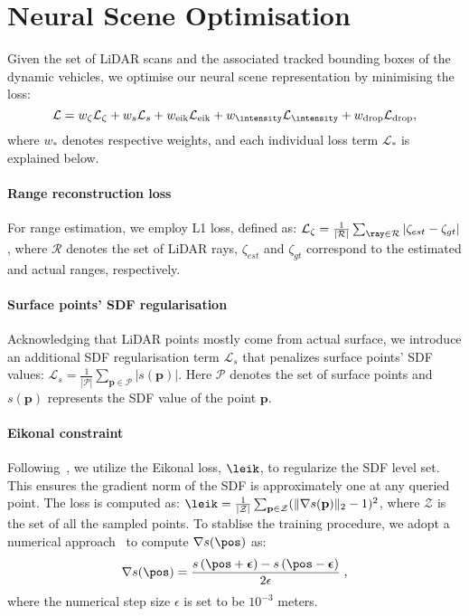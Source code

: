 \section{Neural Scene Optimisation} \label{sec:optmisation}
Given the set of LiDAR scans and the associated tracked bounding boxes of the dynamic vehicles, we optimise our neural scene representation by minimising the loss:
\begin{equation}
    \mathcal{L} = w_{\zeta} \mathcal{L}_{\zeta} +  w_{s} \mathcal{L}_{s} + w_{\text{eik}} \mathcal{L}_{\text{eik}} + w_{\intensity} \mathcal{L}_{\intensity} + w_{\text{drop}} \mathcal{L}_{\text{drop}},
    \label{loss}
\end{equation}
where $w_{*}$ denotes respective weights, and each individual loss term $\mathcal{L}_*$ is explained below.


\paragraph{Range reconstruction loss}
For range estimation, we employ L1 loss, defined as: $\mathcal{L}_{\zeta} = \frac{1}{|\mathcal{R}|}\sum_{\ray \in \mathcal{R}}|\zeta_{est} -\zeta_{gt}|$, where $\mathcal{R}$ denotes the set of LiDAR rays, $\zeta_{est}$ and $\zeta_{gt}$ correspond to the estimated and actual ranges, respectively. 


\paragraph{Surface points' SDF regularisation} \label{sec:surfacesdf}
Acknowledging that LiDAR points mostly come from actual surface, we introduce an additional SDF regularisation term $\mathcal{L}_{s}$ that penalizes surface points' SDF values: $\mathcal{L}_{s} = \frac{1}{|\mathcal{P}|}\sum_{\mathbf{p} \in \mathcal{P}}|s(\mathbf{p})|$. Here $\mathcal{P}$ denotes the set of surface points and $s({\mathbf{p}})$ represents the SDF value of the point $\mathbf{p}$.


\paragraph{Eikonal constraint}
Following~\cite{icml2020_2086}, we utilize the Eikonal loss, $\leik$, to regularize the SDF level set. This ensures the gradient norm of the SDF is approximately one at any queried point. The loss is computed as: $\leik = \frac{1}{|\mathcal{Z}|} \sum_{\mathbf{p} \in \mathcal{Z}}( \| \nabla s(\mathbf{p}) \|_2 - 1)^2$, where $\mathcal{Z}$ is the set of all the sampled points. To stablise the training procedure, we adopt a numerical approach~\cite{li2023neuralangelo} to compute $\nabla s(\pos)$ as: 
\begin{equation}
    \nabla s(\pos) = \frac{s \left( \pos + \boldsymbol{\epsilon} \right) - s \left(\pos - \boldsymbol{\epsilon} \right)}{2 \epsilon} \;,
    \label{eqn:central_diff_normal}
\end{equation}
where the numerical step size $\epsilon$ is set to be $10^{-3}$ meters.


